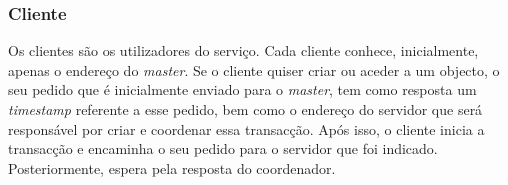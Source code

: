 \subsubsection{Cliente}

Os clientes são os utilizadores do serviço. Cada cliente conhece, inicialmente, apenas o endereço do \textit{master}. Se o cliente quiser criar ou aceder a um objecto, o seu pedido que é inicialmente enviado para o \textit{master}, tem como resposta um \textit{timestamp} referente a esse pedido, bem como o endereço do servidor que será responsável por criar e coordenar essa transacção. Após isso, o cliente inicia a transacção e encaminha o seu pedido para o servidor que foi indicado. Posteriormente, espera pela resposta do coordenador. 